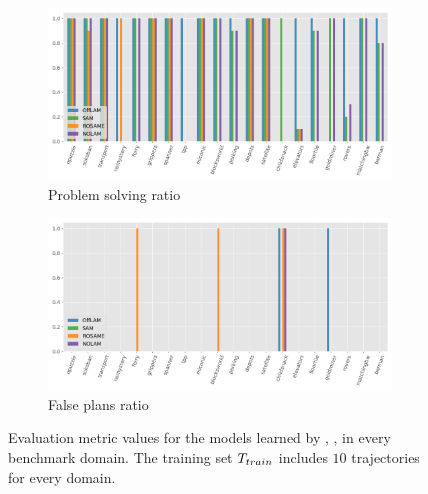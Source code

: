 \begin{figure}[ht]
  \begin{subfigure}[b]{0.45\textwidth}
    \includegraphics[width=\textwidth]{figures/10_traces/barplots/solving.png}
    \caption{Problem solving ratio}
    \label{fig:solving-ratio}
  \end{subfigure}
  \begin{subfigure}[b]{0.45\textwidth}
    \includegraphics[width=\textwidth]{figures/10_traces/barplots/false_plans.png}
    \caption{False plans ratio}
    \label{fig:false-positive-plans}
  \end{subfigure}

\caption{Evaluation metric values for the models learned by \sam, \offlam, \nolam in every benchmark domain. The training set $T_{train}$ includes $10$ trajectories for every domain.}
\end{figure} 